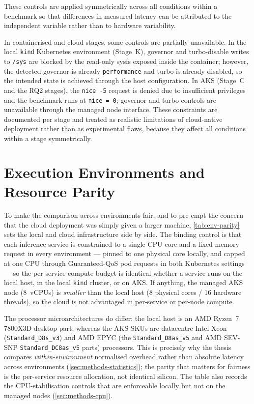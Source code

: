 These controls are applied symmetrically across all conditions within a benchmark so
that differences in measured latency can be attributed to the independent variable
rather than to hardware variability.

In containerised and cloud stages, some controls are partially unavailable.
In the local \texttt{kind} Kubernetes environment (Stage~K), governor and turbo-disable
writes to \texttt{/sys} are blocked by the read-only sysfs exposed inside the container;
however, the detected governor is already \texttt{performance} and turbo is already
disabled, so the intended state is achieved through the host configuration.
In AKS (Stage~C and the RQ2 stages), the \texttt{nice~-5} request is denied due to insufficient
privileges and the benchmark runs at \texttt{nice~=~0}; governor and turbo controls
are unavailable through the managed node interface.
These constraints are documented per stage and treated as realistic limitations of
cloud-native deployment rather than as experimental flaws, because they affect all
conditions within a stage symmetrically.

\section{Execution Environments and Resource Parity}
\label{sec:methods-envparity}

To make the comparison across environments fair, and to pre-empt the concern that the
cloud deployment was simply given a larger machine, \cref{tab:env-parity} sets the local
and cloud infrastructure side by side. The binding control is that each inference service
is constrained to a single CPU core and a fixed memory request in every environment ---
pinned to one physical core locally, and capped at one CPU through Guaranteed-QoS pod
requests in both Kubernetes settings --- so the per-service compute budget is identical
whether a service runs on the local host, in the local \texttt{kind} cluster, or on AKS.
If anything, the managed AKS node (8~vCPUs) is \emph{smaller} than the local host (8
physical cores / 16 hardware threads), so the cloud is not advantaged in per-service or
per-node compute.

The processor microarchitectures do differ: the local host is an AMD Ryzen~7 7800X3D
desktop part, whereas the AKS SKUs are datacentre Intel Xeon (\texttt{Standard\_D8s\_v3})
and AMD EPYC (the \texttt{Standard\_D8as\_v5} and AMD SEV-SNP \texttt{Standard\_DC8as\_v5}
parts) processors. This is precisely why the thesis compares \emph{within-environment}
normalised overhead rather than absolute latency across environments
(\cref{sec:methods-statistics}); the parity that matters for fairness is the per-service
resource allocation, not identical silicon. The table also records the CPU-stabilisation
controls that are enforceable locally but not on the managed nodes (\cref{sec:methods-cpu}).

